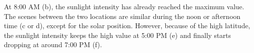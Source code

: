 \documentclass{article}
\begin{document}
At 8:00 AM (b), the sunlight intensity has already reached the maximum value. The scenes between the two locations are 
similar during the noon or afternoon time (c or d), except for the solar position. However, because of the high latitude,
the sunlight intensity keeps the high value at 5:00 PM (e) and finally starts dropping at around 7:00 PM (f).

\begin{figure}[h]
  \centering
  \hfill
  \hfill
  

\end{figure}
\end{document}
